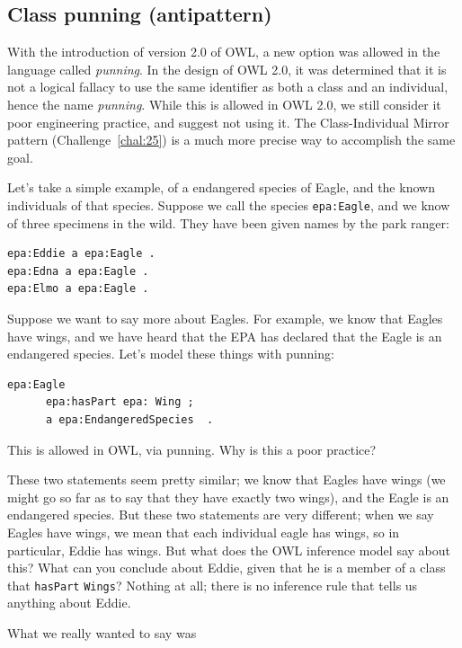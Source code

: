 \subsection{Class punning (antipattern)\label{punning}}

With the introduction of version 2.0 of OWL, a new option was allowed in the 
language called \emph{punning}.  In the design of OWL 2.0, it was determined that 
it is not a logical fallacy to use the same identifier as both a class and 
an individual, hence the name \emph{punning}.  While this is allowed in OWL 2.0, 
we still consider it poor engineering practice, and suggest not using it.  The
Class-Individual Mirror pattern (Challenge~\ref{chal:25}) is a much more precise way
to accomplish the same goal. 

Let's take a simple example, of a endangered species of Eagle, and the known 
individuals of that species.  Suppose we call the species \texttt{epa:Eagle}, and 
we know of three specimens in the wild.  They have been given names by the 
park ranger:

\begin{lstlisting}
epa:Eddie a epa:Eagle .
epa:Edna a epa:Eagle .
epa:Elmo a epa:Eagle . 
\end{lstlisting}

Suppose we want to say more about Eagles.  For example, we know that Eagles have 
wings, and we have heard that the EPA has declared that the Eagle is an endangered species.
Let's model these things with punning:

\begin{lstlisting}
epa:Eagle 
      epa:hasPart epa: Wing ;
      a epa:EndangeredSpecies  .
\end{lstlisting}

This is allowed in OWL, via punning.  Why is this a poor practice? 

These two statements seem pretty similar; we know that Eagles have wings 
(we might go so far as to say that they have exactly two wings), and
the Eagle is an endangered species. But these
two statements are very different; when we say Eagles have wings, we mean that 
each individual eagle has wings, so in particular, Eddie has wings.  But 
what does the OWL inference model say about this?  What can you conclude about Eddie,
given that he is a member of a class that \texttt{hasPart} \texttt{Wings}? 
Nothing at all; there is no inference rule that 
tells us anything about Eddie. 

What we really
wanted to say was 

